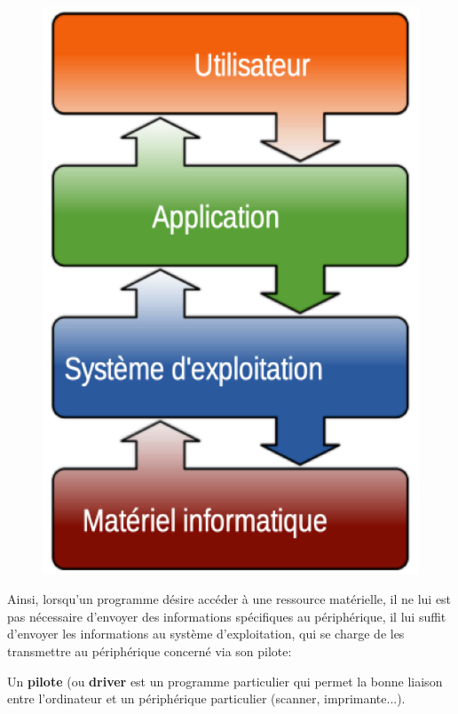 \documentclass[11pt, a4paper]{book}
\begin{document}
\begin{figure}[h]
	\centering
	\includegraphics[scale=.3]{images/systemeexploitation}
\end{figure}
	
	Ainsi, lorsqu’un programme désire accéder à une ressource matérielle, il ne lui est pas nécessaire d’envoyer des informations spécifiques au périphérique, il lui suffit d’envoyer les informations au système d’exploitation, qui se charge de les transmettre au périphérique concerné via son pilote:
	
	\begin{defi}
		Un {\bf pilote} (ou {\bf driver} est un programme particulier qui permet la bonne liaison entre l'ordinateur et un périphérique particulier (scanner, imprimante...).
	
	\end{defi}
	
\end{document}
